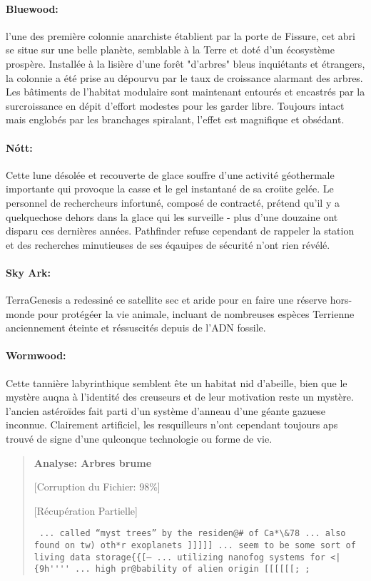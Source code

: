 \paragraph{Bluewood:} \label{sec:bluewood} l'une des première colonnie anarchiste établient par la porte de Fissure, cet abri se situe sur une belle planète, semblable à la Terre et doté d'un écosystème prospère. Installée à la lisière d'une forêt "d'arbres" bleus inquiétants et étrangers, la colonnie a été prise au dépourvu par le taux de croissance alarmant des arbres. Les bâtiments de l'habitat modulaire sont maintenant entourés et encastrés par la surcroissance en dépit d'effort modestes pour les garder libre. Toujours intact mais englobés par les branchages spiralant, l'effet est magnifique et obsédant. 

\paragraph{Nótt:} \label{sec:nott} Cette lune désolée et recouverte de glace souffre d'une activité géothermale importante qui provoque la casse et le gel instantané de sa croüte gelée. Le personnel de rechercheurs infortuné, composé de contracté, prétend qu'il y a quelquechose dehors dans la glace qui les surveille - plus d'une douzaine ont disparu ces dernières années. Pathfinder refuse cependant de rappeler la station et des recherches minutieuses de ses éqauipes de sécurité n'ont rien révélé. 

\paragraph{Sky Ark:} \label{sec:sky-ark} TerraGenesis a redessiné ce satellite sec et aride pour en faire une réserve hors-monde pour protégéer la vie animale, incluant de nombreuses espèces Terrienne anciennement éteinte et réssuscités depuis de l'ADN fossile. 

\paragraph{Wormwood:} \label{sec:wormwood} Cette tannière labyrinthique semblent ête un habitat nid d'abeille, bien que le mystère auqna à l'identité des creuseurs et de leur motivation reste un mystère. l'ancien astéroïdes fait parti d'un système d'anneau d'une géante gazuese inconnue. Clairement artificiel, les resquilleurs n'ont cependant toujours aps trouvé de signe d'une qulconque technologie ou forme de vie. 

\begin{quotation} \textbf{Analyse: Arbres brume} 

[Corruption du Fichier: 98\%] 

[Récupération Partielle] 

\begin{verbatim} ... called “myst trees” by the residen@# of Ca*\&78 ... also found on tw) oth*r exoplanets ]]]]] ... seem to be some sort of living data storage{{[— ... utilizing nanofog systems for <|{9h'''' ... high pr@bability of alien origin [[[[[[; ; \end{verbatim} \end{quotation} 



